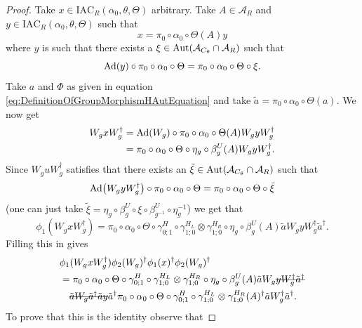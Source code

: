 \documentclass[12pt,a4paper,twoside]{article}
\newcommand{\stkout}[1]{\ifmmode\text{\sout{\ensuremath{#1}}}\else\sout{#1}\fi}
\newcommand{\IAC}{\textrm{IAC}}
\let\originalleft\left
\let\originalright\right
\renewcommand{\left}{\mathopen{}\mathclose\bgroup\originalleft}
\renewcommand{\right}{\aftergroup\egroup\originalright}
\renewcommand{\AA}{\mathcal A}
\newcommand{\Ad}[1]{\textrm{Ad}\left(#1\right)}
\newcommand{\Aut}[1]{\textrm{Aut}\left(#1\right)}
\theoremstyle{definition}
\numberwithin{equation}{section}
\begin{document}
\begin{proof}
	Take $x\in \IAC_R(\alpha_0,\theta,\Theta)$ arbitrary. Take $A\in\AA_R$ and $y\in\IAC_R(\alpha_0,\theta,\Theta)$ such that
	\begin{equation}
		x=\pi_0\circ\alpha_0\circ\Theta(A)y
	\end{equation}
	where $y$ is such that there exists a $\xi\in\Aut{\AA_{C_\theta}\cap \AA_R}$ such that
	\begin{equation}
		\Ad{y}\circ\pi_0\circ\alpha_0\circ\Theta=\pi_0\circ\alpha_0\circ\Theta\circ\xi.
	\end{equation}
	Take $a$ and $\Phi$ as given in equation \eqref{eq:DefinitionOfGroupMorphismHAutEquation} and take $\tilde{a}=\pi_0\circ\alpha_0\circ\Theta(a)$. We now get
	\begin{align}
		W_g x W_g^\dagger&=\Ad{W_g}\circ\pi_0\circ\alpha_0\circ\Theta(A) W_gyW_g^\dagger\\
		&=\pi_0\circ\alpha_0\circ\Theta\circ\eta_g\circ\beta_g^U(A) W_gyW_g^\dagger.
	\end{align}
	Since $W_g uW_g^\dagger$ satisfies that there exists an $\tilde{\xi}\in\Aut{\AA_{C_\theta}\cap \AA_R}$ such that
	\begin{equation}
		\Ad{W_gyW_g^\dagger}\circ \pi_0\circ\alpha_0\circ\Theta=\pi_0\circ\alpha_0\circ\Theta\circ\tilde\xi
	\end{equation}
	(one can just take $\tilde\xi=\eta_g\circ\beta_g^U\circ\xi\circ\beta_{g^{-1}}^U\circ\eta_g^{-1}$) we get that
	\begin{equation}
		\phi_1(W_gxW_g^{\dagger})=\pi_0\circ\alpha_0\circ\Theta\circ\gamma^{H}_{0;1}\circ\gamma^{H_L}_{1;0}\otimes\gamma^{H_R}_{1;0}\circ\eta_g\circ\beta_g^U(A)\tilde{a}W_gyW_g^\dagger\tilde{a}^\dagger.
	\end{equation}
	Filling this in gives
	\begin{align}
		&\phi_1(W_gxW_g^\dagger)\phi_2(W_g)^\dagger\phi_1(x)^\dagger\phi_2(W_g)^\dagger\\
		\label{eq:phi1phi2matchingConditionEquation}
		&=\pi_0\circ\alpha_0\circ\Theta\circ\gamma^{H}_{0;1}\circ\gamma^{H_L}_{1;0}\otimes\gamma^{H_R}_{1;0}\circ\eta_g\circ\beta_g^U(A)\tilde{a}W_g\stkout{yW_g^\dagger\tilde{a}^\dagger}\\
		\nonumber
		&\quad\stkout{\tilde{a}W_g\tilde{a}^\dagger\tilde{a}y}\tilde{a}^\dagger\pi_0\circ\alpha_0\circ\Theta\circ\gamma^{H}_{0;1}\circ\gamma^{H_L}_{1;0}\otimes\gamma^{H_R}_{1;0}(A)^\dagger\tilde{a}W_g^\dagger\tilde{a}^\dagger.
	\end{align}
	To prove that this is the identity observe that

\end{proof}
\end{document}
